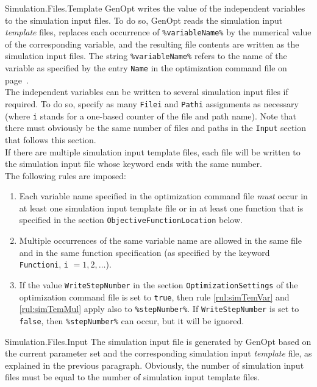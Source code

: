 \begin{codedescription}
\item[Simulation.Files.Template]
\label{sec:inpTemFil}
GenOpt writes the value of the independent variables
to the simulation input files.
To do so, GenOpt reads the simulation input \emph{template} files, replaces each occurrence of \verb$%variableName%$ by the numerical value of the corresponding variable, and the resulting file contents are written as the simulation input files. The string \verb$%variableName%$ refers to the name of the variable as specified by the entry \verb$Name$ in the optimization command file on page~\pageref{par:comFil}.\\

The independent variables can be written to several simulation input files if required.
To do so, specify as many \verb$Filei$ and \verb$Pathi$ assignments as necessary
(where \verb$i$ stands for a one-based counter of the file and path name).
Note that there must obviously be the same number of files and paths in the \verb$Input$ section that follows this section.\\

If there are multiple simulation input template files, each file will be written to the simulation input file whose keyword ends with the same number.\\ 

\noindent The following rules are imposed:
\begin{enumerate}
\item \label{rul:simTemVar} Each variable name specified in the optimization command file \emph{must} occur in at least one simulation input template file or in at least one function that is specified in the section \texttt{ObjectiveFunctionLocation} below.
\item \label{rul:simTemMul} Multiple occurrences of the same variable name are allowed in the same file and in the same function specification (as specified by the keyword \verb$Functioni$, \verb$i$ $= 1, 2, \ldots$).
\item If the value \verb$WriteStepNumber$ in the section \verb$OptimizationSettings$ of the optimization command file is set to \verb$true$, then rule \ref{rul:simTemVar} and \ref{rul:simTemMul} apply also to \verb$%stepNumber%$. If \verb$WriteStepNumber$ is set to \verb$false$, then \verb$%stepNumber%$ can occur, but it will 
be ignored.
\end{enumerate}

\item[Simulation.Files.Input]
The simulation input file is generated by GenOpt based on the current parameter set and the corresponding simulation input \emph{template} file, as explained in the previous paragraph. Obviously, the number of simulation input files must be equal to the number of simulation input template files.\\


\end{codedescription}
